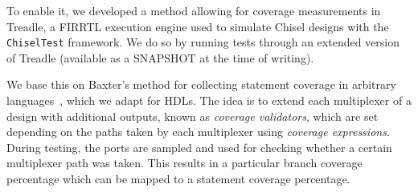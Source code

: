 \documentclass[a4paper]{IEEEtran}
\newcommand{\martin}[1]{{\color{blue} Martin: #1}}
\begin{document}
To enable it, we developed a method allowing for coverage measurements in Treadle, a FIRRTL execution engine used to simulate Chisel designs with the \texttt{ChiselTest} framework. We do so by running tests through an extended version of Treadle (available as a SNAPSHOT at the time of writing).%


We base this on Baxter's method for collecting statement coverage in arbitrary languages~\cite{branch-cov-made-easy:2002}, which we adapt for HDLs. 
The idea is to extend each multiplexer of a design with additional outputs, known as \textit{coverage validators}, which are set depending on the paths taken by each multiplexer using \textit{coverage expressions}.
During testing, the ports are sampled and used for checking whether a certain multiplexer path was taken.
This results in a particular branch coverage percentage which can be mapped to a statement coverage percentage.
\end{document}
